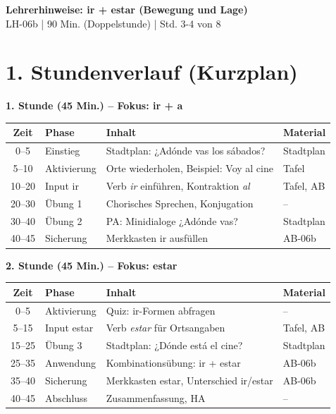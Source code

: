 \documentclass[11pt, a4paper]{article}
\newcommand{\fachfarbe}{spanisch}
\newcommand{\thema}{ir + estar (Bewegung und Lage)}
\newcommand{\sequenz}{06}
\newcommand{\block}{b}
\newcommand{\dauer}{90 Min. (Doppelstunde)}
\begin{document}
\begin{center}
    {\Large\bfseries\textcolor{\fachfarbe}{Lehrerhinweise: \thema}}\\[0.3em]
    {\normalsize LH-\sequenz\block{} | \dauer{} | Std. 3-4 von 8}
\end{center}

\vspace{10pt}


\section*{1. Stundenverlauf (Kurzplan)}

\textbf{1. Stunde (45 Min.) -- Fokus: ir + a}

\begin{tabularx}{\textwidth}{|c|l|X|l|}
\hline
\textbf{Zeit} & \textbf{Phase} & \textbf{Inhalt} & \textbf{Material} \\
\hline
0--5 & Einstieg & Stadtplan: ¿Adónde vas los sábados? & Stadtplan \\
\hline
5--10 & Aktivierung & Orte wiederholen, Beispiel: Voy al cine & Tafel \\
\hline
10--20 & Input ir & Verb \textit{ir} einführen, Kontraktion \textit{al} & Tafel, AB \\
\hline
20--30 & Übung 1 & Chorisches Sprechen, Konjugation & -- \\
\hline
30--40 & Übung 2 & PA: Minidialoge ¿Adónde vas? & Stadtplan \\
\hline
40--45 & Sicherung & Merkkasten ir ausfüllen & AB-06b \\
\hline
\end{tabularx}

\vspace{1em}

\textbf{2. Stunde (45 Min.) -- Fokus: estar}

\begin{tabularx}{\textwidth}{|c|l|X|l|}
\hline
\textbf{Zeit} & \textbf{Phase} & \textbf{Inhalt} & \textbf{Material} \\
\hline
0--5 & Aktivierung & Quiz: ir-Formen abfragen & -- \\
\hline
5--15 & Input estar & Verb \textit{estar} für Ortsangaben & Tafel, AB \\
\hline
15--25 & Übung 3 & Stadtplan: ¿Dónde está el cine? & Stadtplan \\
\hline
25--35 & Anwendung & Kombinationsübung: ir + estar & AB-06b \\
\hline
35--40 & Sicherung & Merkkasten estar, Unterschied ir/estar & AB-06b \\
\hline
40--45 & Abschluss & Zusammenfassung, HA & -- \\
\hline
\end{tabularx}
\end{document}
